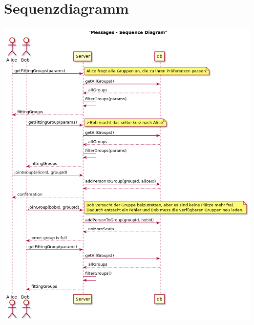 \documentclass[a4paper]{scrreprt}
\begin{document}
\section{Sequenzdiagramm}	
\begin{center}
	\includegraphics[scale=0.57]{res/Szenario_Fail.png}
\end{center}
\newpage
\end{document}
